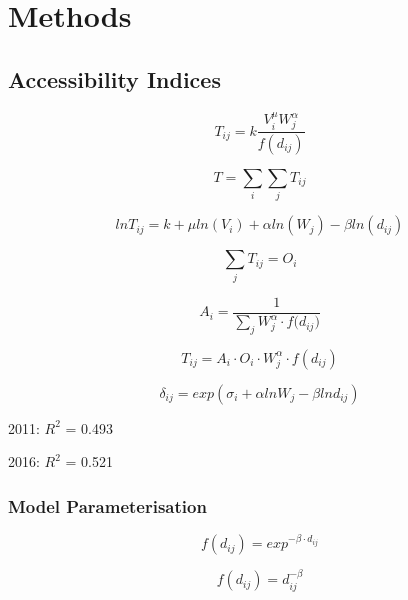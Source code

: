 \section{Methods}

\subsection{Accessibility Indices}

\begin{equation}
T_{ij} = k\frac{V_{i}^{\mu} W_{j}^{\alpha}}{f(d_{ij})}
\end{equation}

\begin{equation}
    T = \sum_{i}\sum_{j}T_{ij}
\end{equation}

\begin{equation}
    ln T_{ij} = k + \mu ln(V_{i}) + \alpha ln(W_{j}) - \beta ln(d_{ij})
\end{equation}

\begin{equation}
    \sum_{j}T_{ij} = O_{i}
\end{equation}

\begin{equation}
    A_i = \frac{1}{\sum_{j}W^{\alpha}_{j} \cdot f({d_{ij})}}
\end{equation}

\begin{equation}
    T_{ij} = A_{i}\cdot O_{i} \cdot W_{j}^{\alpha} \cdot f(d_{ij})
\end{equation}

\begin{equation}
    \delta_{ij} = exp(\sigma_{i} + \alpha ln W_{j} - \beta ln d_{ij}) 
\end{equation}

2011: $R^{2}$ = 0.493

2016: $R^{2}$ = 0.521

\subsubsection{Model Parameterisation}

\begin{equation}
    f(d_{ij}) = exp^{-\beta \cdot d_{ij}}
\end{equation}

\begin{equation}
    f(d_{ij}) = d_{ij}^{-\beta}
\end{equation}

